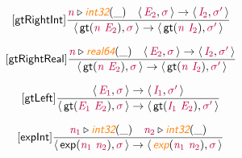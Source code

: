 \documentclass[10pt,leqno,fleqn]{article}
\newcommand{\artVariable}[1]{\mbox{\color{purple}\em #1\/}}
\newcommand{\artConstructor}[1]{\mbox{\sf #1}}
\newcommand{\artSpecial}[1]{\mbox{\color{orange}\sf\em #1}}
\begin{document}
\begin{equation}
\tag*{[\artConstructor{\sf gtRightInt}]}
\begin{split}\frac{ \artVariable{n}\triangleright \artSpecial{int32}(\_) \quad \langle\, \artVariable{E$_{2}$}, \artVariable{$\sigma$}\,\rangle \rightarrow \langle\, \artVariable{I$_{2}$}, \artVariable{$\sigma$\/$^\prime$}\,\rangle }{\langle\, \artConstructor{\sf gt}(\artVariable{n}\ \artVariable{E$_{2}$}), \artVariable{$\sigma$}\,\rangle \rightarrow \langle\, \artConstructor{\sf gt}(\artVariable{n}\ \artVariable{I$_{2}$}), \artVariable{$\sigma$\/$^\prime$}\,\rangle }
\end{split}
\end{equation}

\begin{equation}
\tag*{[\artConstructor{\sf gtRightReal}]}
\begin{split}\frac{ \artVariable{n}\triangleright \artSpecial{real64}(\_) \quad \langle\, \artVariable{E$_{2}$}, \artVariable{$\sigma$}\,\rangle \rightarrow \langle\, \artVariable{I$_{2}$}, \artVariable{$\sigma$\/$^\prime$}\,\rangle }{\langle\, \artConstructor{\sf gt}(\artVariable{n}\ \artVariable{E$_{2}$}), \artVariable{$\sigma$}\,\rangle \rightarrow \langle\, \artConstructor{\sf gt}(\artVariable{n}\ \artVariable{I$_{2}$}), \artVariable{$\sigma$\/$^\prime$}\,\rangle }
\end{split}
\end{equation}

\begin{equation}
\tag*{[\artConstructor{\sf gtLeft}]}
\begin{split}\frac{\langle\, \artVariable{E$_{1}$}, \artVariable{$\sigma$}\,\rangle \rightarrow \langle\, \artVariable{I$_{1}$}, \artVariable{$\sigma$\/$^\prime$}\,\rangle }{\langle\, \artConstructor{\sf gt}(\artVariable{E$_{1}$}\ \artVariable{E$_{2}$}), \artVariable{$\sigma$}\,\rangle \rightarrow \langle\, \artConstructor{\sf gt}(\artVariable{I$_{1}$}\ \artVariable{E$_{2}$}), \artVariable{$\sigma$\/$^\prime$}\,\rangle }
\end{split}
\end{equation}

\begin{equation}
\tag*{[\artConstructor{\sf expInt}]}
\begin{split}\frac{ \artVariable{n$_{1}$}\triangleright \artSpecial{int32}(\_) \quad  \artVariable{n$_{2}$}\triangleright \artSpecial{int32}(\_) }{\langle\, \artConstructor{\sf exp}(\artVariable{n$_{1}$}\ \artVariable{n$_{2}$}), \artVariable{$\sigma$}\,\rangle \rightarrow \langle\, \artSpecial{exp}(\artVariable{n$_{1}$}\ \artVariable{n$_{2}$}), \artVariable{$\sigma$}\,\rangle }
\end{split}
\end{equation}
\end{document}

